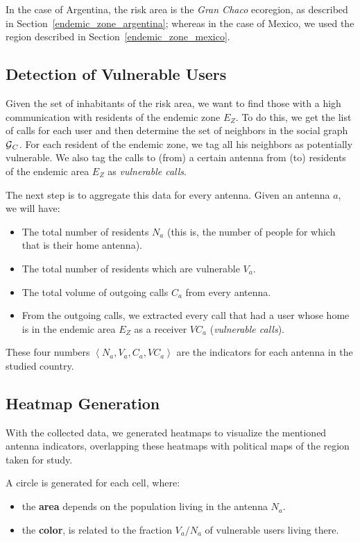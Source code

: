 In the case of Argentina, the risk area is the \textit{Gran Chaco} ecoregion, as described in Section~\ref{endemic_zone_argentina};
whereas in the case of Mexico, we used the region described in Section~\ref{endemic_zone_mexico}.


\subsection{Detection of Vulnerable Users}

    Given the set of inhabitants of the risk area, we want to find those with a high communication with residents of the endemic zone $E_Z$. To do this, we get the list of calls for each user and then determine the set of neighbors in the social graph $\operatorname{\mathcal{G}}_C$. For each resident of the endemic zone, we tag all his neighbors as potentially vulnerable. We also tag the calls to (from) a certain antenna from (to) residents of the endemic area $E_Z$ as \textit{vulnerable calls}.
    
    The next step is to aggregate this data for every antenna. Given an antenna $a$, we will have:
    \begin{itemize}
        \item The total number of residents $N_a$ (this is, the number of people for which that is their home antenna).
        \item The total number of residents which are vulnerable $V_a$.
		\item The total volume of outgoing calls $C_a$ from every antenna.
		\item From the outgoing calls, we extracted every call that had a user whose home is in the endemic area $E_Z$ as a receiver $VC_a$ (\textit{vulnerable calls}).
    \end{itemize}
    
    These four numbers $\left< N_a, V_a, C_a, VC_a \right>$ are the indicators for each antenna in the studied country.



\subsection{Heatmap Generation}
    With the collected data, we generated heatmaps to visualize the mentioned antenna indicators, overlapping these heatmaps with political maps of the region taken for study.
    
	A circle is generated for each cell, where:
	\begin{itemize}
		\item the \textbf{area} depends on the population living in the antenna $N_a$.
		\item the \textbf{color}, is related to the fraction ${V_a}/{N_a}$ of vulnerable users living there.
	\end{itemize}


